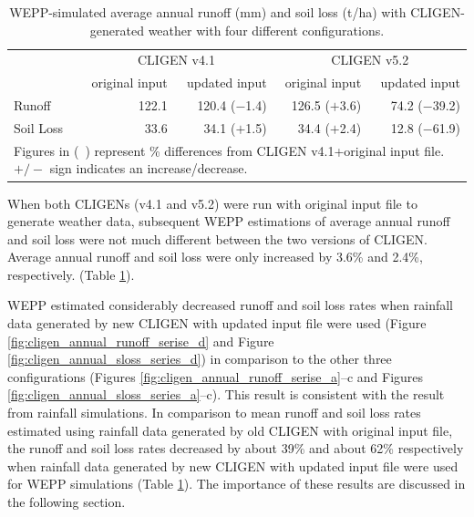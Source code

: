\begin{table}[htbp]
  \centering
  \caption[WEPP-simulated average annual runoff and soil loss]{WEPP-simulated
average annual runoff (mm) and soil loss (t/ha) with CLIGEN-generated
weather with four different configurations.}
  \label{tab:SimualtedAnnualRunoffAndSoilLossWithDifferentConfiguration}
    \begin{tabular}{lrrrr}
      \toprule
       & \multicolumn{2}{c}{CLIGEN v4.1} &
\multicolumn{2}{c}{CLIGEN v5.2}\\
      \cmidrule(r){2-3}\cmidrule(l){4-5}
       & original input & updated input & original input &
updated input \\
      \midrule
      Runoff & 122.1 & 120.4 ($-$1.4) & 126.5 ($+$3.6) & 74.2 ($-$39.2)\\
      Soil Loss & 33.6 & 34.1 ($+$1.5) & 34.4 ($+$2.4) & 12.8 ($-$61.9)\\
      \bottomrule
      \multicolumn{5}{p{10.5cm}}{\footnotesize Figures in (\ )
represent \% differences from CLIGEN v4.1+original input file. $+/-$ sign
indicates an increase/decrease.}
    \end{tabular}
\end{table}

When both CLIGENs (v4.1 and v5.2) were run with original input file to generate
weather data, subsequent WEPP estimations of average annual runoff and soil loss
were not much different between the two versions of CLIGEN. Average annual
runoff and soil loss were only increased by 3.6\% and 2.4\%, respectively.
(Table \ref{tab:SimualtedAnnualRunoffAndSoilLossWithDifferentConfiguration}).

WEPP estimated considerably decreased runoff and soil loss rates when rainfall
data generated by new CLIGEN with updated input file were used (Figure
\ref{fig:cligen_annual_runoff_serise_d} and Figure
\ref{fig:cligen_annual_sloss_series_d}) in comparison to the other three
configurations (Figures
\ref{fig:cligen_annual_runoff_serise_a}--c and Figures
\ref{fig:cligen_annual_sloss_series_a}--c). This result is consistent with the
result from rainfall simulations. In comparison to mean runoff and soil loss
rates estimated using rainfall data generated by old CLIGEN with
original input file, the runoff and soil loss rates decreased by about 39\% and
about 62\% respectively when rainfall data generated by new CLIGEN with updated
input file were used for WEPP simulations (Table
\ref{tab:SimualtedAnnualRunoffAndSoilLossWithDifferentConfiguration}).
The importance of these results are discussed in the following section.

